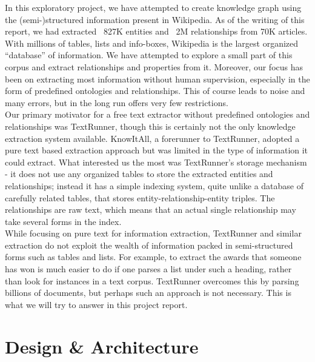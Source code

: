 \documentclass[11pt,twocolumn]{article}
\begin{document}
In this exploratory project, we have attempted to create knowledge graph using the (semi-)structured information present in Wikipedia. As of the writing of this report, we had extracted ~827K entities and ~2M relationships from 70K articles. With millions of tables, lists and info-boxes, Wikipedia is the largest organized ``database'' of information. We have attempted to explore a small part of this corpus and extract relationships and properties from it. Moreover, our focus has been on extracting most information without human supervision, especially in the form of predefined ontologies and relationships. This of course leads to noise and many errors, but in the long run offers very few restrictions.\\

Our primary motivator for a free text extractor without predefined ontologies and relationships was TextRunner, though this is certainly not the only knowledge extraction system available. KnowItAll, a forerunner to TextRunner, adopted a pure text based extraction approach but was limited in the type of information it could extract. What interested us the most was TextRunner's storage mechanism - it does not use any organized tables to store the extracted entities and relationships; instead it has a simple indexing system, quite unlike a database of carefully related tables, that stores entity-relationship-entity triples. The relationships are raw text, which means that an actual single relationship may take several forms in the index.\\

While focusing on pure text for information extraction, TextRunner and similar extraction do not exploit the wealth of information packed in semi-structured forms such as tables and lists. For example, to extract the awards that someone has won is much easier to do if one parses a list under such a heading, rather than look for instances in a text corpus. TextRunner overcomes this by parsing billions of documents, but perhaps such an approach is not necessary. This is what we will try to answer in this project report.


\section{Design \& Architecture}
\end{document}
